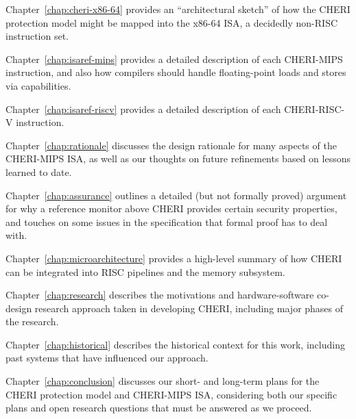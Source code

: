 \medskip
\noindent
Chapter~\ref{chap:cheri-x86-64} provides an ``architectural sketch'' of how
the CHERI protection model might be mapped into the x86-64 ISA, a decidedly
non-RISC instruction set.

\medskip
\noindent
Chapter~\ref{chap:isaref-mips} provides a detailed description of each
CHERI-MIPS instruction, and also how compilers should handle floating-point
loads and stores via capabilities.

\medskip
\noindent
Chapter~\ref{chap:isaref-riscv} provides a detailed description of each
CHERI-RISC-V instruction.

\medskip
\noindent
Chapter~\ref{chap:rationale} discusses the design rationale for many aspects
of the CHERI-MIPS ISA, as well as our thoughts on future refinements based on
lessons learned to date.

\medskip
\noindent
Chapter~\ref{chap:assurance} outlines a detailed (but not formally
proved) argument for
why a reference monitor above CHERI provides certain security
properties, and touches on some issues in the specification that
formal proof has to deal with.

\medskip
\noindent
Chapter~\ref{chap:microarchitecture} provides a high-level summary of how
CHERI can be integrated into RISC pipelines and the memory subsystem.

\medskip
\noindent
Chapter~\ref{chap:research} describes the motivations and hardware-software
co-design research approach taken in developing CHERI, including major phases of
the research.

\medskip
\noindent
Chapter~\ref{chap:historical} describes the historical context for this work,
including past systems that have influenced our approach.

\medskip
\noindent
Chapter~\ref{chap:conclusion} discusses our short- and long-term plans for the
CHERI protection model and CHERI-MIPS ISA, considering both our specific plans
and open research questions that must be answered as we proceed.

